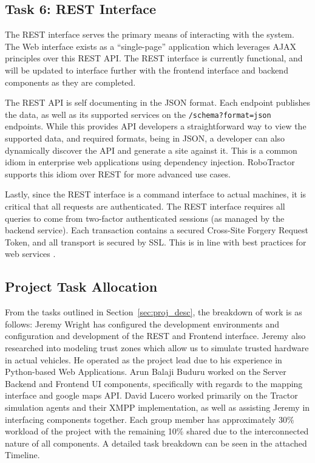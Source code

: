 \documentclass[conference,12pt]{IEEEtran}
\begin{document}
\subsection{Task 6: REST Interface}
The REST interface serves the primary means of interacting with the system.
The Web interface exists as a ``single-page'' application which leverages AJAX
principles over this REST API. The REST interface is currently functional, and
will be updated to interface further with the frontend interface and backend
components as they are completed.

The REST API is self documenting in the JSON format. Each endpoint publishes the
data, as well as its supported services on the \texttt{/schema?format=json}
endpoints. While this provides API developers a straightforward way to view the
supported data, and required formats, being in JSON, a developer can also
dynamically discover the API and generate a site against it.  This is a common
idiom in enterprise web applications using dependency injection.  RoboTractor
supports this idiom over REST for more advanced use cases.

Lastly, since the REST interface is a command interface to actual machines, it
is critical that all requests are authenticated. The REST interface requires all
queries to come from two-factor authenticated sessions (as managed by the
backend service).  Each transaction contains a secured Cross-Site Forgery
Request Token, and all transport is secured by SSL. This is in line with best
practices for web services \autocite{ibm_best_2002}.

\subsection{Project Task Allocation}

From the tasks outlined in Section~\ref{sec:proj_desc}, the breakdown of work is
as follows: Jeremy Wright has configured the development environments and
configuration and development of the REST and Frontend interface. Jeremy also
researched into modeling trust zones which allow us to simulate trusted hardware
in actual vehicles.  He operated as the project lead due to his experience in
Python-based Web Applications.  Arun Balaji Buduru worked on the Server Backend
and Frontend UI components, specifically with regards to the mapping interface
and google maps API. David Lucero worked primarily on the Tractor simulation
agents and their XMPP implementation, as well as assisting Jeremy in interfacing
components together. Each group member has approximately 30\% workload of the
project with the remaining 10\% shared due to the interconnected nature of all
components. A detailed task breakdown can be seen in the attached Timeline.
\end{document}
